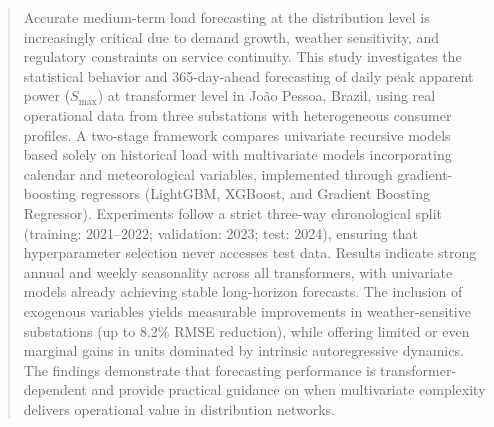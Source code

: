 
\author{Ruan Carlos Virginio dos Santos         \and
        Diego Ernesto Rosa Pessoa \and Thiago José Marques Moura%
}



\date{Received: date / Accepted: date}


\maketitle

\begin{abstract}
Accurate medium-term load forecasting at the distribution level is increasingly critical due to demand growth, weather sensitivity, and regulatory constraints on service continuity. This study investigates the statistical behavior and 365-day-ahead forecasting of daily peak apparent power ($S_{\max}$) at transformer level in João Pessoa, Brazil, using real operational data from three substations with heterogeneous consumer profiles. A two-stage framework compares univariate recursive models based solely on historical load with multivariate models incorporating calendar and meteorological variables, implemented through gradient-boosting regressors (LightGBM, XGBoost, and Gradient Boosting Regressor). Experiments follow a strict three-way chronological split (training: 2021--2022; validation: 2023; test: 2024), ensuring that hyperparameter selection never accesses test data. Results indicate strong annual and weekly seasonality across all transformers, with univariate models already achieving stable long-horizon forecasts. The inclusion of exogenous variables yields measurable improvements in weather-sensitive substations (up to 8.2\% RMSE reduction), while offering limited or even marginal gains in units dominated by intrinsic autoregressive dynamics. The findings demonstrate that forecasting performance is transformer-dependent and provide practical guidance on when multivariate complexity delivers operational value in distribution networks.

\end{abstract}



